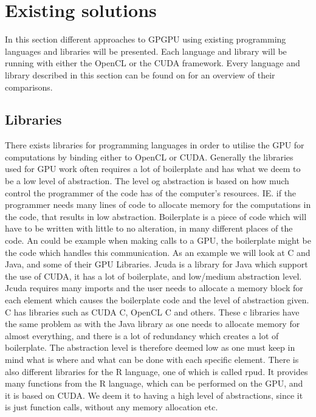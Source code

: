 \section{Existing solutions} %
\label{sec:state_of_the_art}
In this section different approaches to GPGPU using existing programming languages and libraries will be presented.
Each language and library will be running with either the OpenCL or the CUDA framework.
Every language and library described in this section can be found on  for an overview of their comparisons.
      
\subsection{Libraries} 
There exists libraries for programming languages in order to utilise the GPU for computations by binding either to OpenCL or CUDA.
Generally the libraries used for GPU work often requires a lot of boilerplate and has what we deem to be a low level of abstraction.
The level og abstraction is based on how much control the programmer of the code has of the computer's resources.
IE. if the programmer needs many lines of code to allocate memory for the computations in the code, that results in low abstraction.
Boilerplate is a piece of code which will have to be written with little to no alteration, in many different places of the code.
An could be example when making calls to a GPU, the boilerplate might be the code which handles this communication.
As an example we will look at C and Java, and some of their GPU Libraries.
Jcuda is a library for Java which support the use of CUDA, it has a lot of boilerplate, and low/medium abstraction level\citep{Java_library}. 
Jcuda requires many imports and the user needs to allocate a memory block for each element which causes the boilerplate code and the level of abstraction given.\citep{Java_malloc}
C has libraries such as CUDA C, OpenCL C and others.
These c libraries have the same problem as with the Java library as one needs to allocate memory for almost everything, and there is a lot of redundancy which creates a lot of boilerplate.
The abstraction level is therefore deemed low as one must keep in mind what is where and what can be done with each specific element.\citep{C_CUDA} 
There is also different libraries for the R language, one of which is called rpud.
It provides many functions from the R language, which can be performed on the GPU, and it is based on CUDA.
We deem it to having a high level of abstractions, since it is just function calls, without any memory allocation etc.\citep{Rcuda}
                                                 


